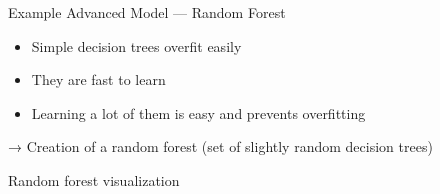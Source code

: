 \begin{frame}{Example Advanced Model — Random Forest}
  \begin{itemize}
  \item Simple decision trees overfit easily
  \item They are fast to learn
  \item Learning a lot of them is easy and prevents overfitting
  \end{itemize}
  → Creation of a random forest (set of slightly random decision trees)
\end{frame}

\begin{frame}{Random forest visualization}
\end{frame}
